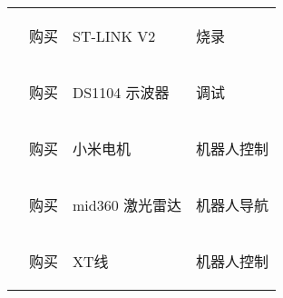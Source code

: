 \begin{longtable}{ X | X | X | X }
    \cline{2-4}

    &
        \begin{center}
            购买
        \end{center}&
        \begin{center}
            ST-LINK V2
        \end{center}&
        \begin{center}
            烧录
        \end{center}\\

    \cline{2-4}

    &
        \begin{center}
            购买
        \end{center}&
        \begin{center}
            DS1104 示波器
        \end{center}&
        \begin{center}
            调试
        \end{center}\\

    \cline{2-4}

    &
        \begin{center}
            购买
        \end{center}&
        \begin{center}
            小米电机
        \end{center}&
        \begin{center}
            机器人控制
        \end{center}\\

    \cline{2-4}

    &
        \begin{center}
            购买
        \end{center}&
        \begin{center}
            mid360 激光雷达
        \end{center}&
        \begin{center}
            机器人导航
        \end{center}\\

    \cline{2-4}

    &
        \begin{center}
            购买
        \end{center}&
        \begin{center}
            XT线
        \end{center}&
        \begin{center}
            机器人控制
        \end{center}\\


\end{longtable}
